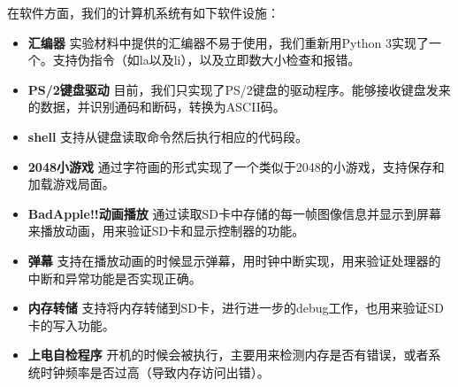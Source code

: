 \documentclass[11pt,utf8]{report}
\begin{document}
在软件方面，我们的计算机系统有如下软件设施：
\begin{itemize}
\item \textbf{汇编器} 实验材料中提供的汇编器不易于使用，我们重新用Python 3实现了一个。支持伪指令（如la以及li），以及立即数大小检查和报错。
\item \textbf{PS/2键盘驱动} 目前，我们只实现了PS/2键盘的驱动程序。能够接收键盘发来的数据，并识别通码和断码，转换为ASCII码。
\item \textbf{shell} 支持从键盘读取命令然后执行相应的代码段。
\item \textbf{2048小游戏} 通过字符画的形式实现了一个类似于2048的小游戏，支持保存和加载游戏局面。
\item \textbf{BadApple!!动画播放} 通过读取SD卡中存储的每一帧图像信息并显示到屏幕来播放动画，用来验证SD卡和显示控制器的功能。
\item \textbf{弹幕} 支持在播放动画的时候显示弹幕，用时钟中断实现，用来验证处理器的中断和异常功能是否实现正确。
\item \textbf{内存转储} 支持将内存转储到SD卡，进行进一步的debug工作，也用来验证SD卡的写入功能。
\item \textbf{上电自检程序} 开机的时候会被执行，主要用来检测内存是否有错误，或者系统时钟频率是否过高（导致内存访问出错）。
\end{itemize}
\end{document}
